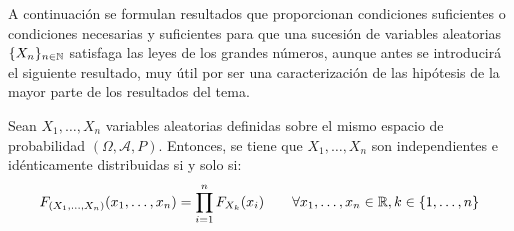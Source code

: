 A continuación se formulan resultados que proporcionan condiciones suficientes o condiciones necesarias y suficientes para que una sucesión de variables aleatorias $\{X_n\}_{n\in \mathbb{N}}$ satisfaga las leyes de los grandes números, aunque antes se introducirá el siguiente resultado, muy útil por ser una caracterización de las hipótesis de la mayor parte de los resultados del tema.
\begin{prop}
    Sean $X_1,\dots,X_n$ variables aleatorias definidas sobre el mismo espacio de probabilidad $(\Omega, \mathcal{A}, P)$. Entonces, se tiene que $X_1,\dots,X_n$ son independientes e idénticamente distribuidas si y solo si:
    \begin{equation*}
        F_{(X_1,\dots,X_n)}(x_1,\dots,x_n) = \prod_{i=1}^{n}F_{X_k}(x_i) \qquad \forall x_1,\dots,x_n\in \mathbb{R}, k\in \{1,\dots,n\}
    \end{equation*}
\end{prop}
